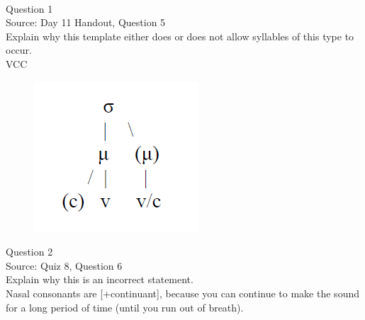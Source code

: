 \documentclass[12pt]{article}
\begin{document}
\newpage

\begin{center}
\textbf{{\color{red}{\HUGE END OF EXAM}}}\\

\end{center}
\newpage

\begin{center}
\textbf{{\color{blue}{\HUGE START OF EXAM\\}}}

\textbf{{\color{blue}{\HUGE Student ID: 9450\\}}}

\textbf{{\color{blue}{\HUGE 11:10 - 11:30 AM\\}}}

\end{center}
\newpage

{\large Question 1}\\

Source: Day 11 Handout, Question 5\\

Explain why this template either does or does not allow syllables of this type to occur.\\

VCC

\begin{figure}[H]
\includegraphics{../images/ponapean_syllabletemplate.png}
\end{figure}

\newpage

{\large Question 2}\\

Source: Quiz 8, Question 6\\

Explain why this is an incorrect statement.\\

Nasal consonants are {[+continuant]}, because you can continue to make the sound for a long period of time (until you run out of breath).
\end{document}
